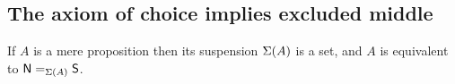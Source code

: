 \documentclass[hott-all.tex]{subfiles}
\begin{document}
\subsection{The axiom of choice implies excluded middle}
% 
% 
% 
\begin{lem}
If $A$ is a mere proposition then its suspension $\susp(A)$ is a set,
and $A$ is equivalent to $\id[\susp(A)]{\north}{\south}$.
\end{lem}
% 
%
%
%
%
%
% 
%
\end{document}
